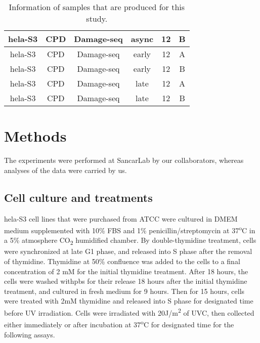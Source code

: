 \begin{table}[H]
\begin{adjustbox}{max width=\textwidth}
\begin{tabular}{cccccc}
    \gls{hela}-S3           & \gls{CPD}              & Damage-seq     & async            & 12            & B                  \\ \hline 
    \gls{hela}-S3           & \gls{CPD}              & Damage-seq     & early            & 12            & A                  \\ \hline 
    \gls{hela}-S3           & \gls{CPD}              & Damage-seq     & early            & 12            & B                  \\ \hline 
    \gls{hela}-S3           & \gls{CPD}              & Damage-seq     & late             & 12            & A                  \\ \hline 
    \gls{hela}-S3           & \gls{CPD}              & Damage-seq     & late             & 12            & B \\
    \hline                
    \end{tabular}
    \end{adjustbox}
    \caption{Information of samples that are produced for this study.}
    \label{tab:samples}
    \end{table}

\section{Methods}

The experiments were performed at SancarLab by our collaborators, whereas analyses of the data were carried by us. 

\subsection{Cell culture and treatments}
\gls{hela}-S3 cell lines that were purchased from ATCC were cultured in DMEM medium supplemented with 10\% FBS and 1\% penicillin/streptomycin at 37\textsuperscript{o}C in a 5\% atmosphere CO\textsubscript{2} humidified chamber. By double-thymidine treatment, cells were synchronized at late G1 phase, and released into S phase after the removal of thymidine. Thymidine at 50\% confluence was added to the cells to a final concentration of 2 mM for the initial thymidine treatment. After 18 hours, the cells were washed with\gls{pbs} for their release 18 hours after the initial thymidine treatment, and cultured in fresh medium for 9 hours. Then for 15 hours, cells were treated with 2mM thymidine and released into S phase for designated time before UV irradiation. Cells were irradiated with 20J/m\textsuperscript{2} of UVC, then collected either immediately or after incubation at 37\textsuperscript{o}C for designated time for the following assays.

